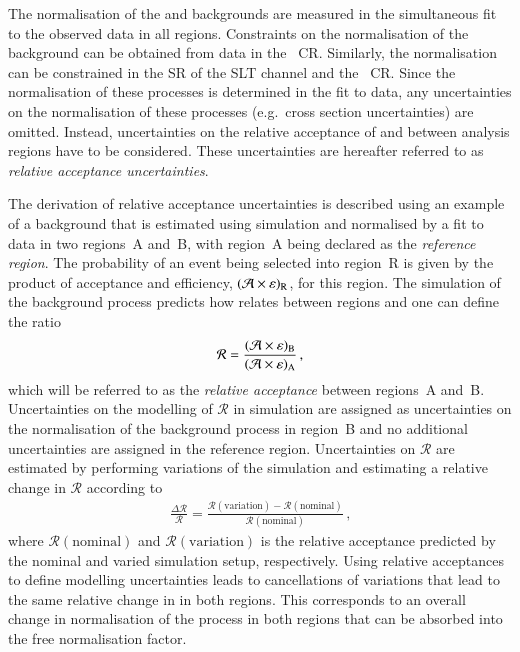 The normalisation of the \ZHF and \ttbar backgrounds are measured in the
simultaneous fit to the observed data in all regions. Constraints on the
normalisation of the \ZHF background can be obtained from data in the
\ZHF~CR. Similarly, the \ttbar normalisation can be constrained in the SR of the
\lephad SLT channel and the \ZHF~CR. Since the normalisation of these processes
is determined in the fit to data, any uncertainties on the normalisation of
these processes (e.g.~cross section uncertainties) are omitted. Instead,
uncertainties on the relative acceptance of \ZHF and \ttbar between analysis
regions have to be considered. These uncertainties are hereafter referred to as
\emph{relative acceptance uncertainties}.

The derivation of relative acceptance uncertainties is described using an
example of a background that is estimated using simulation and normalised by a
fit to data in two regions~A and~B, with region~A being declared as the
\emph{reference region}. The probability of an event being selected into
region~R is given by the product of acceptance and efficiency,
$(\mathcal{A} \times \varepsilon)_{\text{R}}$, for this region. The simulation of the background
process predicts how \AccTimesEff relates between regions and one can define the
ratio
\begin{align*}
  \mathcal{R} = \frac{(\mathcal{A} \times \varepsilon)_{\text{B}}}{(\mathcal{A} \times \varepsilon)_{\text{A}}} \,\text{,}
\end{align*}
which will be referred to as the \emph{relative acceptance} between regions~A
and~B. Uncertainties on the modelling of $\mathcal{R}$ in simulation are
assigned as uncertainties on the normalisation of the background process in
region~B and no additional uncertainties are assigned in the reference
region. Uncertainties on $\mathcal{R}$ are estimated by performing variations of
the simulation and estimating a relative change in $\mathcal{R}$ according to
\begin{align}
  \frac{\Delta \mathcal{R}}{\mathcal{R}} = \frac{\mathcal{R}(\text{variation}) - \mathcal{R}(\text{nominal})}{\mathcal{R}(\text{nominal})} \,\text{,}
  \label{eq:relative_acceptance_uncertainty}
\end{align}
where $\mathcal{R}(\text{nominal})$ and $\mathcal{R}(\text{variation})$ is the
relative acceptance predicted by the nominal and varied simulation setup,
respectively. Using relative acceptances to define modelling uncertainties leads
to cancellations of variations that lead to the same relative change in
\AccTimesEff in both regions. This corresponds to an overall change in
normalisation of the process in both regions that can be absorbed into the free
normalisation factor.


